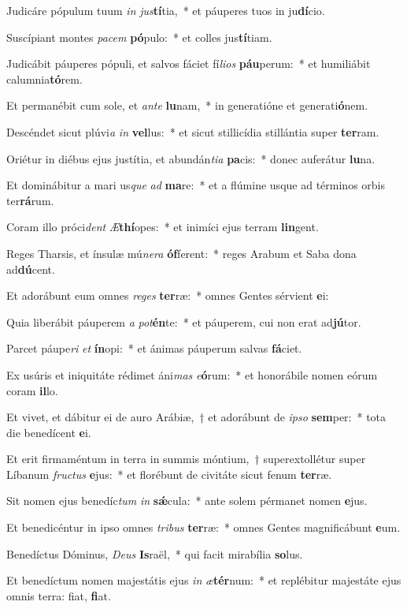 \item Judicáre pópulum tuum \textit{in} \textit{jus}\textbf{tí}tia,~* et páuperes tuos in ju\textbf{dí}cio.
\item Suscípiant montes \textit{pa}\textit{cem} \textbf{pó}pulo:~* et colles jus\textbf{tí}tiam.
\item Judicábit páuperes pópuli, et salvos fáciet fí\textit{li}\textit{os} \textbf{páu}perum:~* et humiliábit calumnia\textbf{tó}rem.
\item Et permanébit cum sole, et \textit{an}\textit{te} \textbf{lu}nam,~* in generatióne et generati\textbf{ó}nem.
\item Descéndet sicut plúvi\textit{a} \textit{in} \textbf{vel}lus:~* et sicut stillicídia stillántia super \textbf{ter}ram.
\item Oriétur in diébus ejus justítia, et abundán\textit{ti}\textit{a} \textbf{pa}cis:~* donec auferátur \textbf{lu}na.
\item Et dominábitur a mari us\textit{que} \textit{ad} \textbf{ma}re:~* et a flúmine usque ad términos orbis ter\textbf{rá}rum.
\item Coram illo próci\textit{dent} \textit{Æ}\textbf{thí}opes:~* et inimíci ejus terram \textbf{lin}gent.
\item Reges Tharsis, et ínsulæ mú\textit{ne}\textit{ra} \textbf{óf}ferent:~* reges Arabum et Saba dona ad\textbf{dú}cent.
\item Et adorábunt eum omnes \textit{re}\textit{ges} \textbf{ter}ræ:~* omnes Gentes sérvient \textbf{e}i:
\item Quia liberábit páuperem \textit{a} \textit{pot}\textbf{én}te:~* et páuperem, cui non erat ad\textbf{jú}tor.
\item Parcet páupe\textit{ri} \textit{et} \textbf{ín}opi:~* et ánimas páuperum salvas \textbf{fá}ciet.
\item Ex usúris et iniquitáte rédimet áni\textit{mas} \textit{e}\textbf{ó}rum:~* et honorábile nomen eórum coram \textbf{il}lo.
\item Et vivet, et dábitur ei de auro Arábiæ,~† et adorábunt de \textit{ip}\textit{so} \textbf{sem}per:~* tota die benedícent \textbf{e}i.
\item Et erit firmaméntum in terra in summis móntium,~† superextollétur super Líbanum \textit{fruc}\textit{tus} \textbf{e}jus:~* et florébunt de civitáte sicut fenum \textbf{ter}ræ.
\item Sit nomen ejus benedíc\textit{tum} \textit{in} \textbf{sǽ}cula:~* ante solem pérmanet nomen \textbf{e}jus.
\item Et benedicéntur in ipso omnes \textit{tri}\textit{bus} \textbf{ter}ræ:~* omnes Gentes magnificábunt \textbf{e}um.
\item Benedíctus Dóminus, \textit{De}\textit{us} \textbf{Is}raël,~* qui facit mirabília \textbf{so}lus.
\item Et benedíctum nomen majestátis ejus \textit{in} \textit{æ}\textbf{tér}num:~* et replébitur majestáte ejus omnis terra: fiat, \textbf{fi}at.
